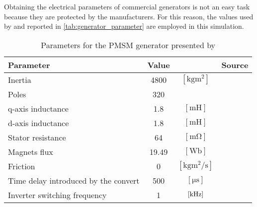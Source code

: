  Obtaining the electrical parameters of commercial generators is not an easy task because they are protected by the manufacturers. For this reason, the values used by \cite{10-MW_Direct-Drive_PMSG-Based_Wind_Energy_Conversion_System_Model} and reported in \autoref{tab:generator_parameter} are employed in this simulation.
\begin{table}[htb]
    \caption{Parameters for the \acrlong{PMSM} generator presented by \cite{10-MW_Direct-Drive_PMSG-Based_Wind_Energy_Conversion_System_Model}}
    \centering
    \begin{tabular}{lccc}
    \toprule
    Parameter & Value & & Source\\ \midrule
    Inertia & 4800 & $\left[\si{\kilo\gram\square\meter}\right]$ & \cite{the_switch_datasheet} \\ \midrule	
    Poles & 320 & & \multirow{5}{*}{\cite{10-MW_Direct-Drive_PMSG-Based_Wind_Energy_Conversion_System_Model}} \\
    q-axis inductance & 1.8 & $\left[\si{\milli\henry}\right]$ & \\
    d-axis inductance & 1.8 & $\left[\si{\milli\henry}\right]$ &\\
    Stator resistance & 64 & $\left[\si{\milli\ohm}\right]$ &\\
    Magnets flux & 19.49 & $\left[\si{\weber}\right]$ &\\ \midrule
    Friction & 0 & $\left[\si{\kilo\gram\square\meter\per\second}\right]$ & \\
    Time delay introduced by the convert & 500 & $\left[\si{\micro\second}\right]$ & \\
    Inverter switching frequency & 1 & $\left[\si{\kilo\hertz}\right]$ & \\
    \bottomrule
    \end{tabular}
    \label{tab:generator_parameter}
\end{table}

